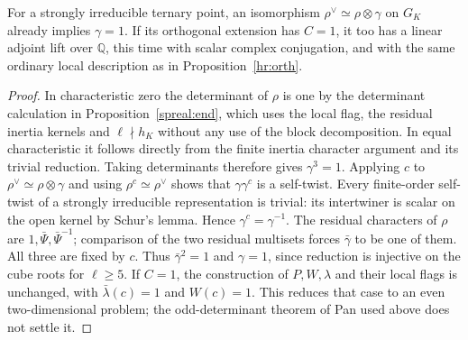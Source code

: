 \begin{corollary}\label{hr:ess}
For a strongly irreducible ternary point, an isomorphism
\(\rho^\vee\simeq\rho\otimes\gamma\) on \(G_K\) already implies
\(\gamma=1\). If its orthogonal extension has \(C=1\), it too has
a linear adjoint lift over \(\mathbb Q\), this time with scalar
complex conjugation, and with the same ordinary local description
as in Proposition~\ref{hr:orth}.
\end{corollary}
\begin{proof}
In characteristic zero the determinant of \(\rho\) is one by the
determinant calculation in Proposition~\ref{spreal:end}, which
uses the local flag, the residual inertia kernels and
\(\ell\nmid h_K\) without any use of the block decomposition.
In equal characteristic it follows directly from the finite inertia
character argument and its trivial reduction. Taking determinants
therefore gives \(\gamma^3=1\). Applying \(c\) to
\(\rho^\vee\simeq\rho\otimes\gamma\) and using
\(\rho^c\simeq\rho^\vee\) shows that \(\gamma\gamma^c\)
is a self-twist. Every finite-order self-twist of a strongly
irreducible representation is trivial: its intertwiner is scalar
on the open kernel by Schur's lemma. Hence \(\gamma^c=\gamma^{-1}\).
The residual characters of \(\rho\) are
\(1,\bar\Psi,\bar\Psi^{-1}\); comparison of the two residual
multisets forces \(\bar\gamma\) to be one of them. All three are
fixed by \(c\). Thus \(\bar\gamma^2=1\) and \(\gamma=1\), since
reduction is injective on the cube roots for \(\ell\ge5\).
If \(C=1\), the construction of \(P,W,\lambda\) and their local
flags is unchanged, with \(\bar\lambda(c)=1\) and \(W(c)=1\).
This reduces that case to an even two-dimensional problem;
the odd-determinant theorem of Pan used above does not settle it.
\end{proof}

